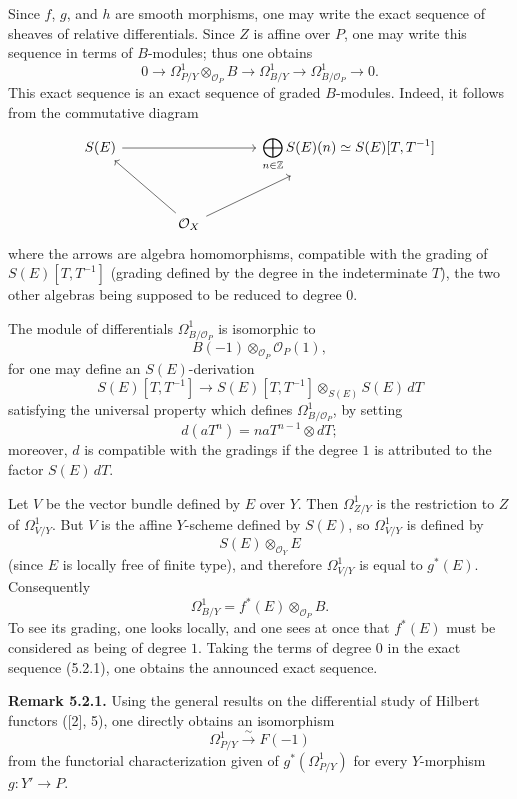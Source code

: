 \documentclass[11pt]{article}
\begin{document}
Since \(f\), \(g\), and \(h\) are smooth morphisms, one may write the exact sequence of sheaves of relative differentials. Since \(Z\) is affine over \(P\), one may write this sequence in terms of \(B\)-modules; thus one obtains
\begin{equation}\tag{5.2.1}
0\longrightarrow
 \Omega^1_{P/Y}\otimes_{\mathcal O_P}B
\longrightarrow
 \Omega^1_{B/Y}
\longrightarrow
 \Omega^1_{B/\mathcal O_P}
\longrightarrow0 .
\end{equation}
This exact sequence is an exact sequence of graded \(B\)-modules. Indeed, it follows from the commutative diagram
\[
\begin{tikzcd}[column sep=large,row sep=large]
S(E) \arrow[rr] && \displaystyle\bigoplus_{n\in\mathbb Z}S(E)(n)\simeq S(E)[T,T^{-1}]\\
& \mathcal O_X \arrow[ul] \arrow[ur] &
\end{tikzcd}
\]
where the arrows are algebra homomorphisms, compatible with the grading of \(S(E)[T,T^{-1}]\) (grading defined by the degree in the indeterminate \(T\)), the two other algebras being supposed to be reduced to degree \(0\).

The module of differentials \(\Omega^1_{B/\mathcal O_P}\) is isomorphic to
\[
 B(-1)\otimes_{\mathcal O_P}\mathcal O_P(1),
\]
for one may define an \(S(E)\)-derivation
\[
S(E)[T,T^{-1}]
\longrightarrow
S(E)[T,T^{-1}]\otimes_{S(E)}S(E)\,dT
\]
satisfying the universal property which defines \(\Omega^1_{B/\mathcal O_P}\), by setting
\[
 d(aT^n)=naT^{n-1}\otimes dT;
\]
moreover, \(d\) is compatible with the gradings if the degree \(1\) is attributed to the factor \(S(E)\,dT\).

Let \(V\) be the vector bundle defined by \(E\) over \(Y\). Then \(\Omega^1_{Z/Y}\) is the restriction to \(Z\) of \(\Omega^1_{V/Y}\). But \(V\) is the affine \(Y\)-scheme defined by \(S(E)\), so \(\Omega^1_{V/Y}\) is defined by
\[
S(E)\otimes_{\mathcal O_Y}E
\]
(since \(E\) is locally free of finite type), and therefore \(\Omega^1_{V/Y}\) is equal to \(g^*(E)\). Consequently
\[
\Omega^1_{B/Y}=f^*(E)\otimes_{\mathcal O_P}B.
\]
To see its grading, one looks locally, and one sees at once that \(f^*(E)\) must be considered as being of degree \(1\). Taking the terms of degree \(0\) in the exact sequence (5.2.1), one obtains the announced exact sequence.

\textbf{Remark 5.2.1.} Using the general results on the differential study of Hilbert functors ([2], 5), one directly obtains an isomorphism
\[
\Omega^1_{P/Y}\xrightarrow{\sim}F(-1)
\]
from the functorial characterization given of \(g^*(\Omega^1_{P/Y})\) for every \(Y\)-morphism \(g:Y'\to P\).
\end{document}
